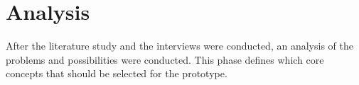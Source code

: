 \section{Analysis}
After the literature study and the interviews were conducted, an analysis of the problems and possibilities were conducted. This phase defines which core concepts that should be selected for the prototype.
